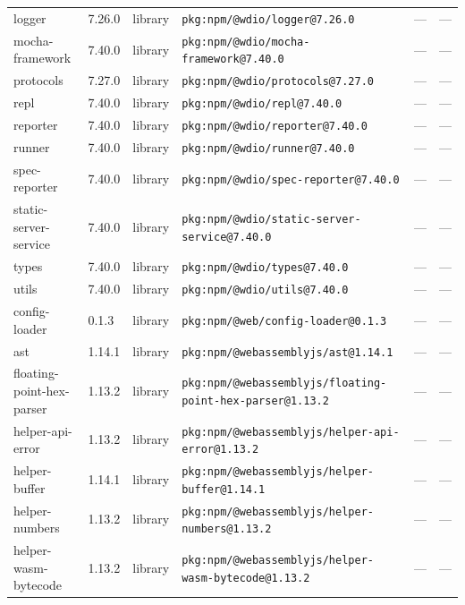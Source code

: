 \documentclass[11pt,a4paper]{article}
\begin{document}
\begin{longtable}{|p{4cm}|p{2cm}|p{1.6cm}|p{5cm}|p{1.5cm}|p{3.5cm}|}
\raggedright logger & 7.26.0 & library & \small\texttt{pkg:npm/@wdio/logger@7.26.0} & — & \small — \\
\raggedright mocha-framework & 7.40.0 & library & \small\texttt{pkg:npm/@wdio/mocha-framework@7.40.0} & — & \small — \\
\raggedright protocols & 7.27.0 & library & \small\texttt{pkg:npm/@wdio/protocols@7.27.0} & — & \small — \\
\raggedright repl & 7.40.0 & library & \small\texttt{pkg:npm/@wdio/repl@7.40.0} & — & \small — \\
\raggedright reporter & 7.40.0 & library & \small\texttt{pkg:npm/@wdio/reporter@7.40.0} & — & \small — \\
\raggedright runner & 7.40.0 & library & \small\texttt{pkg:npm/@wdio/runner@7.40.0} & — & \small — \\
\raggedright spec-reporter & 7.40.0 & library & \small\texttt{pkg:npm/@wdio/spec-reporter@7.40.0} & — & \small — \\
\raggedright static-server-service & 7.40.0 & library & \small\texttt{pkg:npm/@wdio/static-server-service@7.40.0} & — & \small — \\
\raggedright types & 7.40.0 & library & \small\texttt{pkg:npm/@wdio/types@7.40.0} & — & \small — \\
\raggedright utils & 7.40.0 & library & \small\texttt{pkg:npm/@wdio/utils@7.40.0} & — & \small — \\
\raggedright config-loader & 0.1.3 & library & \small\texttt{pkg:npm/@web/config-loader@0.1.3} & — & \small — \\
\raggedright ast & 1.14.1 & library & \small\texttt{pkg:npm/@webassemblyjs/ast@1.14.1} & — & \small — \\
\raggedright floating-point-hex-parser & 1.13.2 & library & \small\texttt{pkg:npm/@webassemblyjs/floating-point-hex-parser@1.13.2} & — & \small — \\
\raggedright helper-api-error & 1.13.2 & library & \small\texttt{pkg:npm/@webassemblyjs/helper-api-error@1.13.2} & — & \small — \\
\raggedright helper-buffer & 1.14.1 & library & \small\texttt{pkg:npm/@webassemblyjs/helper-buffer@1.14.1} & — & \small — \\
\raggedright helper-numbers & 1.13.2 & library & \small\texttt{pkg:npm/@webassemblyjs/helper-numbers@1.13.2} & — & \small — \\
\raggedright helper-wasm-bytecode & 1.13.2 & library & \small\texttt{pkg:npm/@webassemblyjs/helper-wasm-bytecode@1.13.2} & — & \small — \\

\end{longtable}
\end{document}
